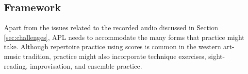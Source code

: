 \documentclass{article}
\begin{document}


\subsection{Framework}

Apart from the issues related to the recorded audio discussed in Section \ref{sec:challenges}, APL needs to accommodate the many forms that practice might take. Although repertoire practice using scores is common in the western art-music tradition, practice might also incorporate technique exercises, sight-reading, improvisation, and ensemble practice.
\end{document}
